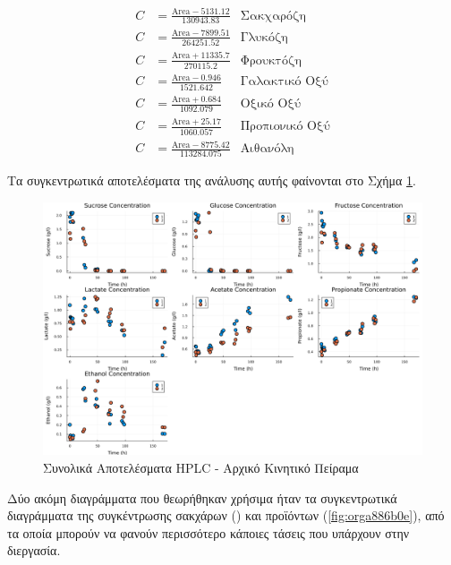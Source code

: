 \documentclass[11pt]{report}
\begin{document}
\begin{enumerate}
\begin{subequations}
\label{eqn:hplc-calibration}
\begin{align}
C &= \frac{\text{Area} - 5131.12}{130943.83} & \text{Σακχαρόζη} \label{eqn:hplc-sucrose} \\
C &= \frac{\text{Area} - 7899.51}{264251.52} & \text{Γλυκόζη} \label{eqn:hplc-glucose} \\
C &= \frac{\text{Area} + 11335.7}{270115.2} & \text{Φρουκτόζη} \label{eqn:hplc-fructose} \\
C &= \frac{\text{Area} - 0.946}{1521.642} & \text{Γαλακτικό Οξύ} \label{eqn:hplc-lactate} \\
C &= \frac{\text{Area} + 0.684}{1092.079} & \text{Οξικό Οξύ} \label{eqn:hplc-acetate} \\
C &= \frac{\text{Area} + 25.17}{1060.057} & \text{Προπιονικό Οξύ} \label{eqn:hplc-propionate} \\
C &= \frac{\text{Area} - 8775.42}{113284.075} & \text{Αιθανόλη} \label{eqn:hplc-ethanol}
\end{align}
\end{subequations}

Τα συγκεντρωτικά αποτελέσματα της ανάλυσης αυτής φαίνονται στο Σχήμα \ref{fig:orgd1a2b42}. 

\begin{figure}[htbp]
\centering
\includegraphics[width=.9\linewidth]{../plots/23_10/final_scatter_23_10.png}
\caption{\label{fig:orgd1a2b42}Συνολικά Αποτελέσματα HPLC - Αρχικό Κινητικό Πείραμα}
\end{figure}

Δύο ακόμη διαγράμματα που θεωρήθηκαν χρήσιμα ήταν τα συγκεντρωτικά διαγράμματα της συγκέντρωσης σακχάρων () και προϊόντων (\ref{fig:orga886b0e}), από τα οποία μπορούν να φανούν περισσότερο κάποιες τάσεις που υπάρχουν στην διεργασία.


\end{enumerate}
\end{document}
